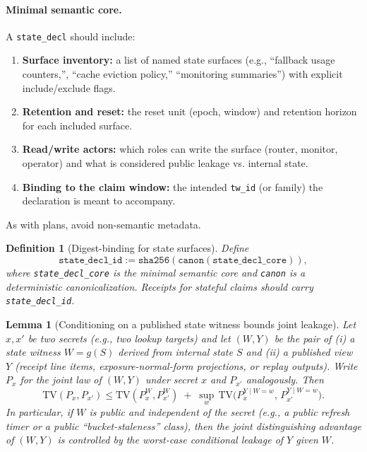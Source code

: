 \documentclass[11pt]{article}
\newtheorem{definition}{Definition}
\newtheorem{lemma}{Lemma}
\newcommand{\TV}{\mathrm{TV}}
\begin{document}
\paragraph{Minimal semantic core.}
A \texttt{state\_decl} should include:
\begin{enumerate}[leftmargin=*]
\item \textbf{Surface inventory:} a list of named state surfaces (e.g., ``fallback usage counters,'', ``cache eviction policy,'' ``monitoring summaries'') with explicit include/exclude flags.
\item \textbf{Retention and reset:} the reset unit (epoch, window) and retention horizon for each included surface.
\item \textbf{Read/write actors:} which roles can write the surface (router, monitor, operator) and what is considered public leakage vs. internal state.
\item \textbf{Binding to the claim window:} the intended \texttt{tw\_id} (or family) the declaration is meant to accompany.
\end{enumerate}
As with plans, avoid non-semantic metadata.

\begin{definition}[Digest-binding for state surfaces]
Define
\[\texttt{state\_decl\_id} := \texttt{sha256}(\texttt{canon}(\texttt{state\_decl\_core})),\]
where \texttt{state\_decl\_core} is the minimal semantic core and \texttt{canon} is a deterministic canonicalization.
Receipts for stateful claims should carry \texttt{state\_decl\_id}.\cite{series:receiptitems,series:workedexample}
\end{definition}

\begin{lemma}[Conditioning on a published state witness bounds joint leakage]\label{lem:tv_state_witness}
Let $x,x'$ be two secrets (e.g., two lookup targets) and let $(W,Y)$ be the pair of
(i) a \emph{state witness} $W=g(S)$ derived from internal state $S$ and
(ii) a published view $Y$ (receipt line items, exposure-normal-form projections, or replay outputs).
Write $P_x$ for the joint law of $(W,Y)$ under secret $x$ and $P_{x'}$ analogously.
Then
\[
\TV(P_x, P_{x'}) \le \TV(P_x^W, P_{x'}^W) \;+\; \sup_{w}\,\TV\!\big(P_x^{Y\mid W=w},\,P_{x'}^{Y\mid W=w}\big).
\]
In particular, if $W$ is public and independent of the secret (e.g., a public refresh timer or a public ``bucket-staleness'' class),
then the joint distinguishing advantage of $(W,Y)$ is controlled by the worst-case conditional leakage of $Y$ given $W$.
\end{lemma}
\end{document}
